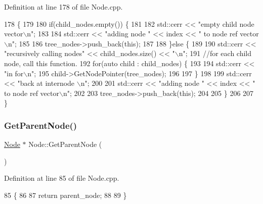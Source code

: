 Definition at line 178 of file Node.\+cpp.


\begin{DoxyCode}
178                                                      \{
179   
180   \textcolor{keywordflow}{if}(child\_nodes.empty()) \{
181     
182     std::cerr << \textcolor{stringliteral}{"empty child node vector\(\backslash\)n"};
183     
184     std::cerr << \textcolor{stringliteral}{"adding node "} << index << \textcolor{stringliteral}{" to node ref vector\(\backslash\)n"};
185     
186     tree\_nodes->push\_back(\textcolor{keyword}{this});
187     
188   \}\textcolor{keywordflow}{else} \{
189     
190     std::cerr << \textcolor{stringliteral}{"recursively calling nodes"} << child\_nodes.size() << \textcolor{stringliteral}{"\(\backslash\)n"};
191     \textcolor{comment}{//for each child node, call this function.}
192     \textcolor{keywordflow}{for}(\textcolor{keyword}{auto} child : child\_nodes) \{
193       
194       std::cerr << \textcolor{stringliteral}{"in for\(\backslash\)n"}; 
195       child->GetNodePointer(tree\_nodes);
196       
197     \}
198     
199     std::cerr << \textcolor{stringliteral}{"back at internode \(\backslash\)n"};
200     
201     std::cerr << \textcolor{stringliteral}{"adding node "} << index << \textcolor{stringliteral}{" to node ref vector\(\backslash\)n"};
202     
203     tree\_nodes->push\_back(\textcolor{keyword}{this});
204     
205   \}
206   
207 \}
\end{DoxyCode}
\mbox{\label{classNode_a032d93c17743138203c77c721edfdae6}} 
\subsubsection{\texorpdfstring{Get\+Parent\+Node()}{GetParentNode()}}
{\footnotesize\ttfamily \hyperlink{classNode}{Node} $\ast$ Node\+::\+Get\+Parent\+Node (\begin{DoxyParamCaption}{ }\end{DoxyParamCaption})}



Definition at line 85 of file Node.\+cpp.


\begin{DoxyCode}
85                          \{
86   
87   \textcolor{keywordflow}{return} parent\_node;
88   
89 \}
\end{DoxyCode}
\mbox{\label{classNode_a69f309f68de4f08e950a15ae79571ec0}} 
